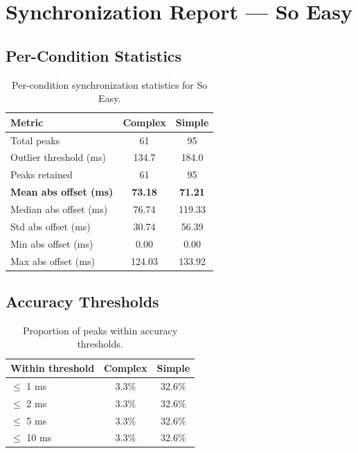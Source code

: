 
\section*{Synchronization Report --- So Easy}

\subsection*{Per-Condition Statistics}

\begin{table}[h!]
\centering
\begin{tabular}{|l|c|c|}
\hline
Metric & Complex & Simple \\
\hline
Total peaks & 61 & 95 \\
Outlier threshold (ms) & 134.7 & 184.0 \\
Peaks retained & 61 & 95 \\
\textbf{Mean abs offset (ms)} & \textbf{73.18} & \textbf{71.21} \\
Median abs offset (ms) & 76.74 & 119.33 \\
Std abs offset (ms) & 30.74 & 56.39 \\
Min abs offset (ms) & 0.00 & 0.00 \\
Max abs offset (ms) & 124.03 & 133.92 \\
\hline
\end{tabular}
\caption{Per-condition synchronization statistics for So Easy.}
\label{tab:sync_stats}
\end{table}

\subsection*{Accuracy Thresholds}

\begin{table}[h!]
\centering
\begin{tabular}{|l|c|c|}
\hline
Within threshold & Complex & Simple \\
\hline
$\leq$ 1 ms & 3.3\% & 32.6\% \\
$\leq$ 2 ms & 3.3\% & 32.6\% \\
$\leq$ 5 ms & 3.3\% & 32.6\% \\
$\leq$ 10 ms & 3.3\% & 32.6\% \\
\hline
\end{tabular}
\caption{Proportion of peaks within accuracy thresholds.}
\label{tab:sync_accuracy}
\end{table}

